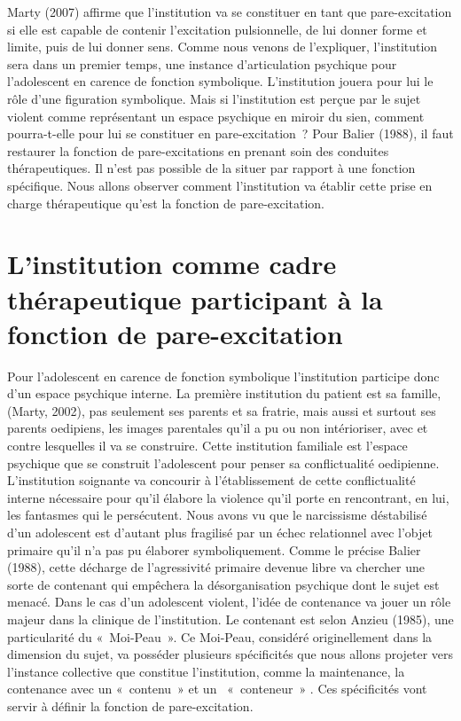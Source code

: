 \documentclass[12pt, a4paper]{book}
\begin{document}
\begin{spacing}{1.5}
Marty (2007) affirme que l'institution va se constituer en tant que pare-excitation si elle est capable de contenir l'excitation pulsionnelle, de lui donner forme et limite, puis de lui donner sens. Comme nous venons de l'expliquer, l'institution sera dans un premier temps, une instance d'articulation psychique pour l'adolescent en carence de fonction symbolique. L'institution jouera pour lui le rôle d'une figuration symbolique. Mais si l'institution est perçue par le sujet violent comme représentant un espace psychique en miroir du sien, comment pourra-t-elle pour lui se constituer en pare-excitation ? Pour Balier (1988), il faut restaurer la fonction de pare-excitations en prenant soin des conduites thérapeutiques. Il n'est pas possible de la situer par rapport à une fonction spécifique. Nous allons observer comment l'institution va établir cette prise en charge thérapeutique qu'est la fonction de pare-excitation.

\section{L'institution comme cadre thérapeutique participant à la fonction de pare-excitation}

Pour l'adolescent en carence de fonction  symbolique  l'institution participe  donc d'un espace psychique interne.
La première institution du patient est sa famille, (Marty, 2002), pas seulement ses parents et sa fratrie, mais aussi et surtout ses parents oedipiens, les images parentales qu'il a pu ou non intérioriser, avec et contre lesquelles il va se construire. Cette institution familiale est l'espace psychique que se construit l'adolescent pour penser sa conflictualité oedipienne. L'institution soignante va concourir à l'établissement de cette conflictualité interne nécessaire pour qu'il élabore la violence qu'il porte en rencontrant, en lui, les fantasmes qui le persécutent. Nous avons vu que le narcissisme déstabilisé d'un adolescent est d'autant plus fragilisé par un échec relationnel avec l'objet primaire qu'il n'a pas pu élaborer symboliquement. Comme le précise Balier (1988), cette décharge de l'agressivité primaire devenue libre va chercher une sorte de contenant qui empêchera la désorganisation psychique dont le sujet est menacé. Dans le cas d'un adolescent violent, l'idée de contenance va jouer un rôle majeur dans la clinique de l'institution. Le contenant est selon Anzieu (1985), une particularité du « Moi-Peau ». Ce Moi-Peau, considéré originellement dans la dimension du sujet, va posséder plusieurs spécificités que nous allons projeter vers l'instance collective que constitue l'institution, comme la maintenance, la contenance avec un « contenu » et un  « conteneur » . Ces spécificités vont servir à définir la fonction de pare-excitation.


\end{spacing}
\end{document}
